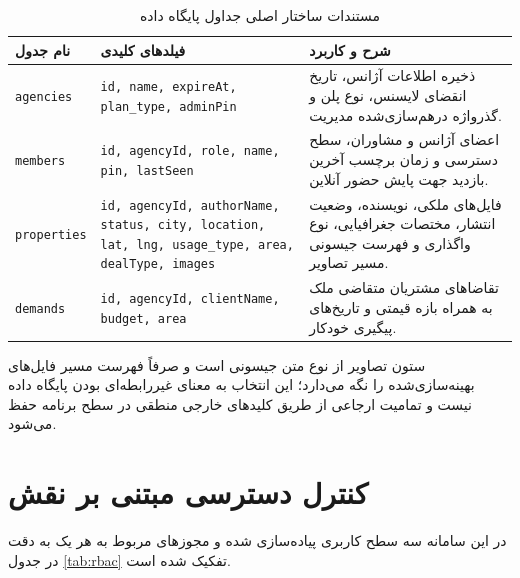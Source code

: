 \documentclass[11pt, a4paper]{report}
\newcommand{\code}[1]{\foreignlanguage{english}{\texttt{#1}}}
\begin{document}
\begin{table}[htbp]
\centering
\caption{مستندات ساختار اصلی جداول پایگاه داده}
\label{tab:db_schema}
\renewcommand{\arraystretch}{1.5}
\begin{tabular}{|p{2.6cm}|p{4.6cm}|p{6.3cm}|}
\hline
\textbf{نام جدول} & \textbf{فیلدهای کلیدی} & \textbf{شرح و کاربرد} \\ \hline
\code{agencies} & \code{id, name, expireAt, plan\_type, adminPin} & ذخیره اطلاعات آژانس، تاریخ انقضای لایسنس، نوع پلن و گذرواژه درهم‌سازی‌شده مدیریت. \\ \hline
\code{members} & \code{id, agencyId, role, name, pin, lastSeen} & اعضای آژانس و مشاوران، سطح دسترسی و زمان برچسب آخرین بازدید جهت پایش حضور آنلاین. \\ \hline
\code{properties} & \code{id, agencyId, authorName, status, city, location, lat, lng, usage\_type, area, dealType, images} & فایل‌های ملکی، نویسنده، وضعیت انتشار، مختصات جغرافیایی، نوع واگذاری و فهرست جیسونی مسیر تصاویر. \\ \hline
\code{demands} & \code{id, agencyId, clientName, budget, area} & تقاضاهای مشتریان متقاضی ملک به همراه بازه قیمتی و تاریخ‌های پیگیری خودکار. \\ \hline
\end{tabular}
\end{table}

ستون تصاویر از نوع متن جیسونی است و صرفاً فهرست مسیر فایل‌های بهینه‌سازی‌شده را نگه می‌دارد؛ این انتخاب به معنای غیررابطه‌ای بودن پایگاه داده نیست و تمامیت ارجاعی از طریق کلیدهای خارجی منطقی در سطح برنامه حفظ می‌شود.

\section{کنترل دسترسی مبتنی بر نقش}
در این سامانه سه سطح کاربری پیاده‌سازی شده و مجوزهای مربوط به هر یک به دقت در جدول \ref{tab:rbac} تفکیک شده است.
\end{document}
